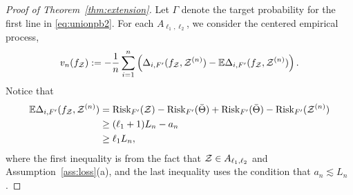 \documentclass[twoside,11pt]{article}
\theoremstyle{definition}
\def\risk{\textup{Risk}}
\begin{document}
\begin{proof}[Proof of Theorem~\ref{thm:extension}]
Let $\Gamma$ denote the target probability for the first line in \eqref{eq:unionpb2}.   For each $A_{\ell_1,\ell_2}$, we consider the centered empirical process,
\begin{align}\label{eq:vn2}
v_n(f_{\mathcal{Z}}) := -\frac{1}{n}\sum_{i=1}^n \left(\Delta_{i,F'}(f_{\mathcal{Z}},\mathcal{Z}^{(n)})- \mathbb{E}\Delta_{i,F'}(f_{\mathcal{Z}},\mathcal{Z}^{(n)})\right).
\end{align}
Notice  that 
\begin{align}
 \mathbb{E}\Delta_{i,F'}(f_\tZ,\tZ^{(n)}) &=  \risk_{F'}({\tZ})-\risk_{F'}(\bar\Theta)+\risk_{F'}({\bar\Theta})-\risk_{F'}(\tZ^{(n)})\\&\geq (\ell_1+1)L_n-a_n\\&\geq \ell_1 L_n,
\end{align}
where the first inequality is from the fact that $\mathcal{Z}\in A_{\ell_1,\ell_2}$ and Assumption~\ref{ass:loss}(a), and the last inequality uses the condition that $a_n\lesssim L_n$.


\end{proof}
\end{document}
